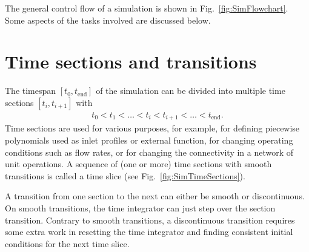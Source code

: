 The general control flow of a simulation is shown in Fig.~\ref{fig:SimFlowchart}.
Some aspects of the tasks involved are discussed below.

\section{Time sections and transitions}\label{sec:SimTimeSections}

The timespan $\left[t_0, t_{\text{end}}\right]$ of the simulation can be divided into multiple time sections $\left[t_i, t_{i+1}\right]$ with
\begin{align*}
	t_0 < t_1 < \dots < t_i < t_{i+1} < \dots < t_{\text{end}}.
\end{align*}
Time sections  are used for various purposes, for example, for defining piecewise polynomials used as inlet profiles or external function, for changing operating conditions such as flow rates, or for changing the connectivity in a network of unit operations.
A sequence of (one or more) time sections with smooth transitions is called a time slice (see Fig.~\ref{fig:SimTimeSections}). 

A transition from one section to the next can either be smooth or discontinuous. 
On smooth transitions, the time integrator can just step over the section transition.
Contrary to smooth transitions, a discontinuous transition requires some extra work in resetting the time integrator and finding consistent initial conditions for the next time slice.

